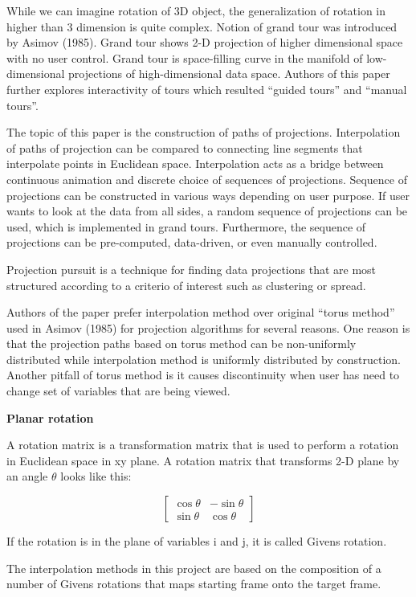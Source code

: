 While we can imagine rotation of 3D object, the generalization of rotation in higher than 3 dimension is quite complex. Notion of grand tour was introduced by Asimov (1985). Grand tour shows 2-D projection of higher dimensional space with no user control. Grand tour is space-filling curve in the manifold of low-dimensional projections of high-dimensional data space. Authors of this paper further explores interactivity of tours which resulted ``guided tours'' and ``manual tours''.

The topic of this paper is the construction of paths of projections. Interpolation of paths of projection can be compared to connecting line segments that interpolate points in Euclidean space. Interpolation acts as a bridge between continuous animation and discrete choice of sequences of projections. Sequence of projections can be constructed in various ways depending on user purpose. If user wants to look at the data from all sides, a random sequence of projections can be used, which is implemented in grand tours. Furthermore, the sequence of projections can be pre-computed, data-driven, or even manually controlled.

Projection pursuit is a technique for finding data projections that are most structured according to a criterio of interest such as clustering or spread.

Authors of the paper prefer interpolation method over original ``torus method'' used in Asimov (1985) for projection algorithms for several reasons. One reason is that the projection paths based on torus method can be non-uniformly distributed while interpolation method is uniformly distributed by construction. Another pitfall of torus method is it causes discontinuity when user has need to change set of variables that are being viewed.

\textbf{Planar rotation}

A rotation matrix is a transformation matrix that is used to perform a rotation in Euclidean space in xy plane. A rotation matrix that transforms 2-D plane by an angle \(\theta\) looks like this:

\[ \begin{bmatrix}\cos \theta &-\sin \theta \\\sin \theta &\cos \theta \end{bmatrix} \]

If the rotation is in the plane of variables i and j, it is called Givens rotation.

The interpolation methods in this project are based on the composition of a number of Givens rotations that maps starting frame onto the target frame.

